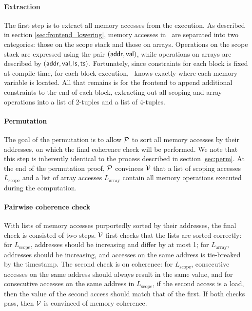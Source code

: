 \paragraph{Extraction} The first step is to extract all memory accesses from the execution. As described in section \ref{sec:frontend_lowering}, memory accesses in \CoBBl~are separated into two categories: those on the scope stack and those on arrays. Operations on the scope stack are expressed using the pair $(\addr, \val)$, while operations on arrays are described by $(\addr, \val, \ls, \ts)$. Fortunately, since constraints for each block is fixed at compile time, for each block execution, \CoBBl~knows exactly where each memory variable is located. All that remains is for the frontend to append additional constraints to the end of each block, extracting out all scoping and array operations into a list of 2-tuples and a list of 4-tuples.

\paragraph{Permutation} The goal of the permutation is to allow $\P$ to sort all memory accesses by their addresses, on which the final coherence check will be performed. We note that this step is inherently identical to the process described in section \ref{sec:perm}. At the end of the permutation proof, $\P$ convinces $\V$ that a list of scoping accesses $L_{\text{scope}}$ and a list of array accesses $L_{\text{array}}$ contain all memory operations executed during the computation.

\paragraph{Pairwise coherence check} With lists of memory accesses purportedly sorted by their addresses, the final check is consisted of two steps. $\V$ first checks that the lists are sorted correctly: for $L_{\text{scope}}$, addresses should be increasing and differ by at most 1; for $L_{\text{array}}$, addresses should be increasing, and accesses on the same address is tie-breaked by the timestamp. The second check is on coherence: for $L_{\text{scope}}$, consecutive accesses on the same address should always result in the same value, and for consecutive accesses on the same address in $L_{\text{scope}}$, if the second access is a load, then the value of the second access should match that of the first. If both checks pass, then $\V$ is convinced of memory coherence.

